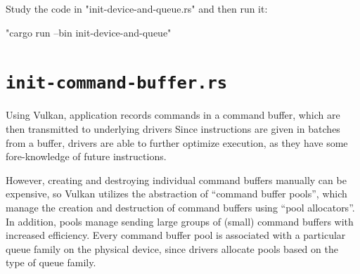 \documentclass[12pt,letterpaper]{article}
\newcommand{\inquotes}[1]{``#1''}	%
\begin{document}
	Study the code in "init-device-and-queue.rs" and then run it:
    	\begin{center}
    		"cargo run --bin init-device-and-queue"
    	\end{center}
      
\section{\texttt{init-command-buffer.rs}}
	Using Vulkan, application records commands in a command buffer, which are then transmitted to underlying drivers Since instructions are given in batches from a buffer, drivers are able to further optimize execution, as they have some fore-knowledge of future instructions.
    
	However, creating and destroying individual command buffers manually can be expensive, so Vulkan utilizes the abstraction of \inquotes{command buffer pools}, which manage the creation and destruction of command buffers using \inquotes{pool allocators}. In addition, pools manage sending large groups of (small) command buffers with increased efficiency. Every command buffer pool is associated with a particular queue family on the physical device, since drivers allocate pools based on the type of queue family.
	
\end{document}
